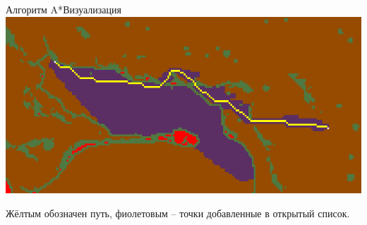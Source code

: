 \documentclass{beamer}
\begin{document}
\begin{frame}{Алгоритм A*}{Визуализация}
\includegraphics[width=1\linewidth]{a_star_on_map.png}

Жёлтым обозначен путь, фиолетовым -- точки добавленные в открытый список.
\end{frame}
\end{document}
